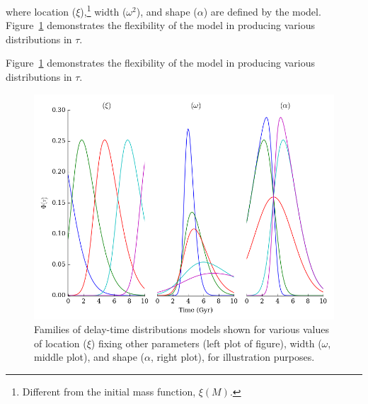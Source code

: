 \documentclass[apj]{aastex62}
\begin{document}
\noindent where location ($\xi$),\footnote{Different from the initial mass function, $\xi(M)$.} width ($\omega^2$), and shape ($\alpha$) are defined by the model. Figure~\ref{fig:dtd_families} demonstrates the flexibility of the model in producing various distributions in $\tau$.

%
%
Figure~\ref{fig:dtd_families} demonstrates the flexibility of the model in producing various distributions in $\tau$. 

\begin{figure}[t]
   \centering
   \includegraphics[width=6.5in]{figure_dtd_families}
   \caption{\footnotesize Families of delay-time distributions models shown for various values of location ($\xi$) fixing other parameters (left plot of figure), width ($\omega$, middle plot), and shape ($\alpha$, right plot), for illustration purposes.}
   \label{fig:dtd_families}
\end{figure}
\end{document}
